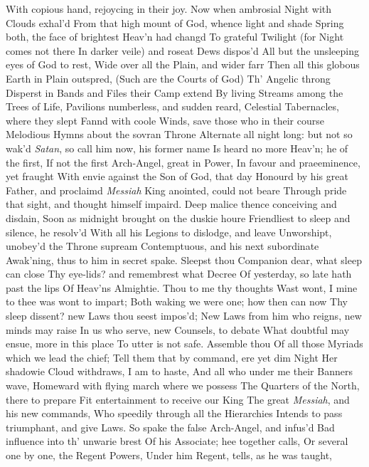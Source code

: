 \documentclass[11pt]{book}
\newcounter {first}
\begin{document}
With copious hand, rejoycing in their joy. 
Now when ambrosial Night with Clouds exhal'd 
From that high mount of God, whence light and shade 
Spring both, the face of brightest Heav'n had changd 
To grateful Twilight (for Night comes not there 
In darker veile) and roseat Dews dispos'd 
All but the unsleeping eyes of God to rest, 
Wide over all the Plain, and wider farr 
Then all this globous Earth in Plain outspred, 
(Such are the Courts of God) Th' Angelic throng 
Disperst in Bands and Files their Camp extend 
By living Streams among the Trees of Life, 
Pavilions numberless, and sudden reard, 
Celestial Tabernacles, where they slept 
Fannd with coole Winds, save those who in their course 
Melodious Hymns about the sovran Throne 
Alternate all night long: but not so wak'd 
\textit{Satan}, so call him now, his former name 
Is heard no more Heav'n; he of the first, 
If not the first Arch-Angel, great in Power, 
In favour and praeeminence, yet fraught 
With envie against the Son of God, that day 
Honourd by his great Father, and proclaimd 
\textit{Messiah} King anointed, could not beare 
Through pride that sight, and thought himself impaird. 
Deep malice thence conceiving and disdain, 
Soon as midnight brought on the duskie houre 
Friendliest to sleep and silence, he resolv'd 
With all his Legions to dislodge, and leave 
Unworshipt, unobey'd the Throne supream 
Contemptuous, and his next subordinate 
Awak'ning, thus to him in secret spake. 
\quad Sleepst thou Companion dear, what sleep can close 
Thy eye-lids? and remembrest what Decree 
Of yesterday, so late hath past the lips 
Of Heav'ns Almightie.  Thou to me thy thoughts 
Wast wont, I mine to thee was wont to impart; 
Both waking we were one; how then can now 
Thy sleep dissent? new Laws thou seest impos'd; 
New Laws from him who reigns, new minds may raise 
In us who serve, new Counsels, to debate 
What doubtful may ensue, more in this place 
To utter is not safe.  Assemble thou 
Of all those Myriads which we lead the chief; 
Tell them that by command, ere yet dim Night 
Her shadowie Cloud withdraws, I am to haste, 
And all who under me their Banners wave, 
Homeward with flying march where we possess 
The Quarters of the North, there to prepare 
Fit entertainment to receive our King 
The great \textit{Messiah}, and his new commands, 
Who speedily through all the Hierarchies 
Intends to pass triumphant, and give Laws. 
\quad So spake the false Arch-Angel, and infus'd 
Bad influence into th' unwarie brest 
Of his Associate; hee together calls, 
Or several one by one, the Regent Powers, 
Under him Regent, tells, as he was taught, 
\end{document}
